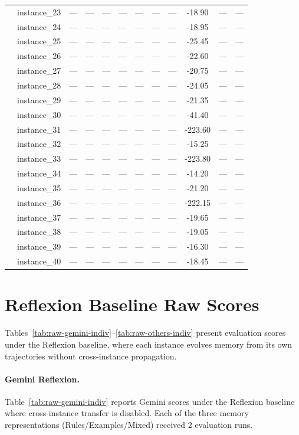 \documentclass[sigconf]{acmart}
\begin{document}
\begin{table}[htbp]
\begin{tabular}{ll cccc ccc ccc}
 & instance\_23 & --- & --- & --- & --- & --- & --- & --- & -18.90 & --- & --- \\
 & instance\_24 & --- & --- & --- & --- & --- & --- & --- & -18.95 & --- & --- \\
 & instance\_25 & --- & --- & --- & --- & --- & --- & --- & -25.45 & --- & --- \\
 & instance\_26 & --- & --- & --- & --- & --- & --- & --- & -22.60 & --- & --- \\
 & instance\_27 & --- & --- & --- & --- & --- & --- & --- & -20.75 & --- & --- \\
 & instance\_28 & --- & --- & --- & --- & --- & --- & --- & -24.05 & --- & --- \\
 & instance\_29 & --- & --- & --- & --- & --- & --- & --- & -21.35 & --- & --- \\
 & instance\_30 & --- & --- & --- & --- & --- & --- & --- & -41.40 & --- & --- \\
 & instance\_31 & --- & --- & --- & --- & --- & --- & --- & -223.60 & --- & --- \\
 & instance\_32 & --- & --- & --- & --- & --- & --- & --- & -15.25 & --- & --- \\
 & instance\_33 & --- & --- & --- & --- & --- & --- & --- & -223.80 & --- & --- \\
 & instance\_34 & --- & --- & --- & --- & --- & --- & --- & -14.20 & --- & --- \\
 & instance\_35 & --- & --- & --- & --- & --- & --- & --- & -21.20 & --- & --- \\
 & instance\_36 & --- & --- & --- & --- & --- & --- & --- & -222.15 & --- & --- \\
 & instance\_37 & --- & --- & --- & --- & --- & --- & --- & -19.65 & --- & --- \\
 & instance\_38 & --- & --- & --- & --- & --- & --- & --- & -19.05 & --- & --- \\
 & instance\_39 & --- & --- & --- & --- & --- & --- & --- & -16.30 & --- & --- \\
 & instance\_40 & --- & --- & --- & --- & --- & --- & --- & -18.45 & --- & --- \\
\bottomrule
\end{tabular}
\end{table}
  
\section{Reflexion Baseline Raw Scores}
\label{app:individual-scores}
Tables~\ref{tab:raw-gemini-indiv}--\ref{tab:raw-others-indiv} present evaluation scores under the Reflexion baseline, where each instance evolves memory from its own trajectories without cross-instance propagation. 
\paragraph{Gemini Reflexion.} Table~\ref{tab:raw-gemini-indiv} reports Gemini scores under the Reflexion baseline where cross-instance transfer is disabled. Each of the three memory representations (Rules/Examples/Mixed) received 2 evaluation runs.%
\end{document}
